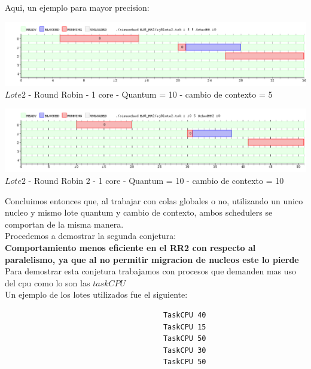  Aqui, un ejemplo para mayor precision:\\
 
  \begin{center}
    	\includegraphics[width=450pt]{./EJ8_RR2/dif3corerr.png}
	{$Lote 2$ - Round Robin - 1 core - Quantum = 10 - cambio de contexto = 5}	
 \end{center}
 
 \begin{center}
    	\includegraphics[width=450pt]{./EJ8_RR2/dif3corerr2.png}
	{$Lote 2$ - Round Robin 2 - 1 core - Quantum = 10 - cambio de contexto = 10}	
 \end{center}
 
 Concluimos entonces que, al trabajar con colas globales o no, utilizando un unico nucleo y
 mismo lote quantum y cambio de contexto, ambos schedulers se comportan de la misma
 manera.\\
 
 Procedemos a demostrar la segunda conjetura:\\
 
 \textbf{Comportamiento menos eficiente en el RR2 con respecto al paralelismo, ya que al no permitir
migracion de nucleos este lo pierde}\\

Para demostrar esta conjetura trabajamos con procesos que demanden mas uso del cpu como 
lo son las $taskCPU$\\

Un ejemplo de los lotes utilizados fue el siguiente:\\

\begin{verbatim}
                                     TaskCPU 40
                                     TaskCPU 15
                                     TaskCPU 50
                                     TaskCPU 30
                                     TaskCPU 50
\end{verbatim}

